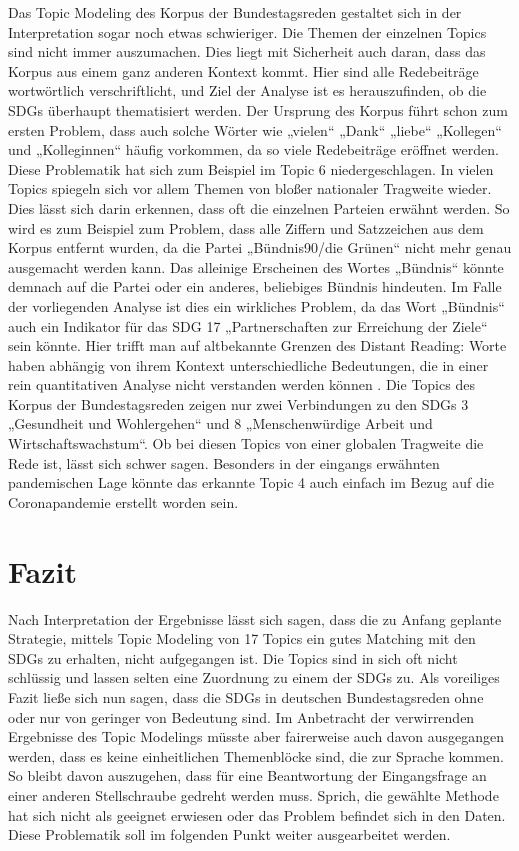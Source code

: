 \documentclass[a4paper,11pt]{article}
\begin{document}
Das Topic Modeling des Korpus der Bundestagsreden gestaltet sich in der
Interpretation sogar noch etwas schwieriger. Die Themen der einzelnen Topics
sind nicht immer auszumachen. Dies liegt mit Sicherheit auch daran, dass das
Korpus aus einem ganz anderen Kontext kommt. Hier sind alle Redebeiträge
wortwörtlich verschriftlicht, und Ziel der Analyse ist es herauszufinden, ob
die SDGs überhaupt thematisiert werden. Der Ursprung des Korpus führt schon
zum ersten Problem, dass auch solche Wörter wie „vielen“ „Dank“ „liebe“
„Kollegen“ und „Kolleginnen“ häufig vorkommen, da so viele Redebeiträge
eröffnet werden. Diese Problematik hat sich zum Beispiel im Topic 6
niedergeschlagen. In vielen Topics spiegeln sich vor allem Themen von bloßer
nationaler Tragweite wieder. Dies lässt sich darin erkennen, dass oft die
einzelnen Parteien erwähnt werden. So wird es zum Beispiel zum Problem, dass
alle Ziffern und Satzzeichen aus dem Korpus entfernt wurden, da die Partei
„Bündnis90/die Grünen“ nicht mehr genau ausgemacht werden kann. Das alleinige
Erscheinen des Wortes „Bündnis“ könnte demnach auf die Partei oder ein
anderes, beliebiges Bündnis hindeuten. Im Falle der vorliegenden Analyse ist
dies ein wirkliches Problem, da das Wort „Bündnis“ auch ein Indikator für das
SDG 17 „Partnerschaften zur Erreichung der Ziele“ sein könnte. Hier trifft man
auf altbekannte Grenzen des Distant Reading: Worte haben abhängig von ihrem
Kontext unterschiedliche Bedeutungen, die in einer rein quantitativen Analyse
nicht verstanden werden können \cite{Ramage}. Die Topics des Korpus der
Bundestagsreden zeigen nur zwei Verbindungen zu den SDGs 3 „Gesundheit und
Wohlergehen“ und 8 „Menschenwürdige Arbeit und Wirtschaftswachstum“.  Ob bei
diesen Topics von einer globalen Tragweite die Rede ist, lässt sich schwer
sagen. Besonders in der eingangs erwähnten pandemischen Lage könnte das
erkannte Topic 4 auch einfach im Bezug auf die Coronapandemie erstellt worden
sein.

\section{Fazit}
Nach Interpretation der Ergebnisse lässt sich sagen, dass die zu Anfang
geplante Strategie, mittels Topic Modeling von 17 Topics ein gutes Matching
mit den SDGs zu erhalten, nicht aufgegangen ist. Die Topics sind in sich oft
nicht schlüssig und lassen selten eine Zuordnung zu einem der SDGs zu. Als
voreiliges Fazit ließe sich nun sagen, dass die SDGs in deutschen
Bundestagsreden ohne oder nur von geringer von Bedeutung sind. Im Anbetracht
der verwirrenden Ergebnisse des Topic Modelings müsste aber fairerweise auch
davon ausgegangen werden, dass es keine einheitlichen Themenblöcke sind, die
zur Sprache kommen. So bleibt davon auszugehen, dass für eine Beantwortung der
Eingangsfrage an einer anderen Stellschraube gedreht werden muss. Sprich, die
gewählte Methode hat sich nicht als geeignet erwiesen oder das Problem
befindet sich in den Daten. Diese Problematik soll im folgenden Punkt weiter
ausgearbeitet werden.
\end{document}
